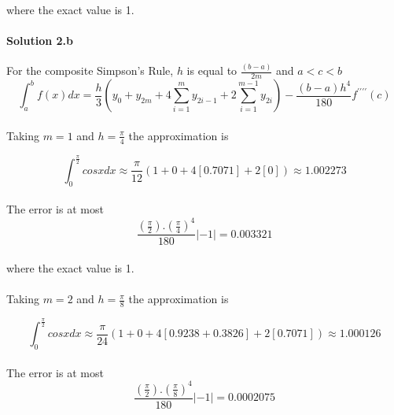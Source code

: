 \documentclass[11pt]{article}
\begin{document}
\paragraph{} where the exact value is 1.

\paragraph{Solution 2.b} For the composite Simpson's Rule, $h$ is equal to $\frac{(b-a)}{2m} $ and $a < c < b$
\begin{equation*}
\int_{a}^{b} f(x) dx = \frac{h}{3} (y_0 + y_{2m} + 4 \sum\limits_{i=1}^{m} y_{2i-1} + 2 \sum\limits_{i=1}^{m-1} y_{2i})
 - \frac{(b-a)h^4}{180} f^{\prime\prime\prime\prime}(c)
\end{equation*}
\paragraph{} Taking $m=1$ and $h= \frac{\pi}{4}$ the approximation is 

\begin{equation*}
\int_{0}^{\frac{\pi}{2}} cosx dx \approx \frac{\pi}{12} (1 + 0 + 4[0.7071] + 2[0]) \approx 1.002273
\end{equation*}
\paragraph{} The error is at most
\begin{equation*}
\frac{(\frac{\pi}{2}).(\frac{\pi}{4})^4}{180} \left|-1\right| = 0.003321
\end{equation*}
\paragraph{} where the exact value is 1.

\paragraph{} Taking $m=2$ and $h= \frac{\pi}{8}$ the approximation is 

\begin{equation*}
\int_{0}^{\frac{\pi}{2}} cosx dx \approx \frac{\pi}{24} (1 + 0 + 4[0.9238 + 0.3826] + 2[0.7071]) \approx 1.000126
\end{equation*}
\paragraph{} The error is at most
\begin{equation*}
\frac{(\frac{\pi}{2}).(\frac{\pi}{8})^4}{180} \left|-1\right| = 0.0002075
\end{equation*}
\end{document}
